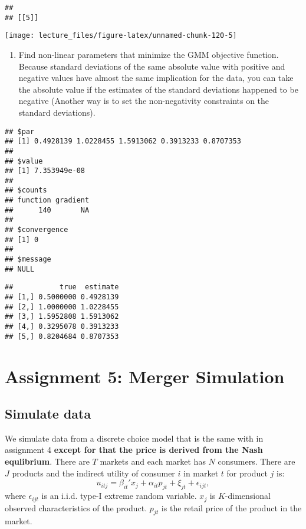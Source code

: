 \documentclass[
]{book}
\providecommand{\tightlist}{%
  \setlength{\itemsep}{0pt}\setlength{\parskip}{0pt}}
\begin{document}
\begin{verbatim}
## 
## [[5]]
\end{verbatim}

\begin{center}\texttt{[image: lecture\_files/figure-latex/unnamed-chunk-120-5]} \end{center}

\begin{enumerate}
\def\labelenumi{\arabic{enumi}.}
\setcounter{enumi}{12}
\tightlist
\item
  Find non-linear parameters that minimize the GMM objective function. Because standard deviations of the same absolute value with positive and negative values have almost the same implication for the data, you can take the absolute value if the estimates of the standard deviations happened to be negative (Another way is to set the non-negativity constraints on the standard deviations).
\end{enumerate}

\begin{verbatim}
## $par
## [1] 0.4928139 1.0228455 1.5913062 0.3913233 0.8707353
## 
## $value
## [1] 7.353949e-08
## 
## $counts
## function gradient 
##      140       NA 
## 
## $convergence
## [1] 0
## 
## $message
## NULL
\end{verbatim}

\begin{verbatim}
##           true  estimate
## [1,] 0.5000000 0.4928139
## [2,] 1.0000000 1.0228455
## [3,] 1.5952808 1.5913062
## [4,] 0.3295078 0.3913233
## [5,] 0.8204684 0.8707353
\end{verbatim}

\hypertarget{assignment5}{%
\chapter{Assignment 5: Merger Simulation}\label{assignment5}}

\hypertarget{simulate-data-4}{%
\section{Simulate data}\label{simulate-data-4}}

We simulate data from a discrete choice model that is the same with in assignment 4 \textbf{except for that the price is derived from the Nash equlibrium}. There are \(T\) markets and each market has \(N\) consumers. There are \(J\) products and the indirect utility of consumer \(i\) in market \(t\) for product \(j\) is:
\[
u_{itj} = \beta_{it}' x_j + \alpha_{it} p_{jt} + \xi_{jt} + \epsilon_{ijt},
\]
where \(\epsilon_{ijt}\) is an i.i.d. type-I extreme random variable. \(x_j\) is \(K\)-dimensional observed characteristics of the product. \(p_{jt}\) is the retail price of the product in the market.
\end{document}
